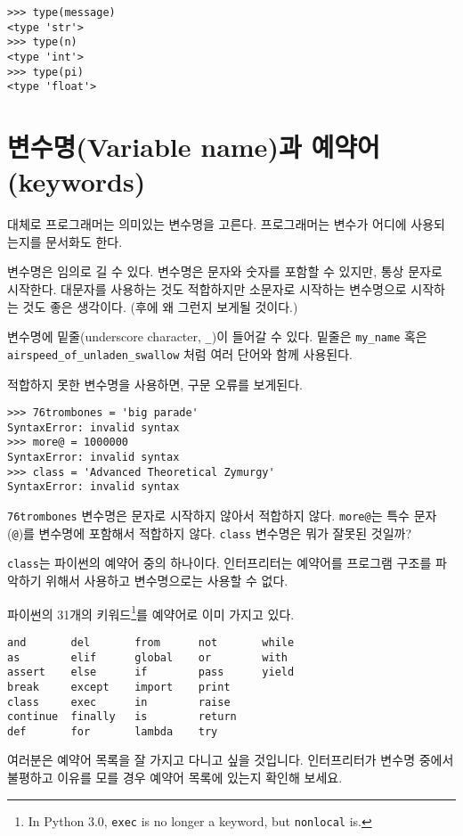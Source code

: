 \beforeverb
\begin{verbatim}
>>> type(message)
<type 'str'>
>>> type(n)
<type 'int'>
>>> type(pi)
<type 'float'>
\end{verbatim}
\afterverb
%

\section{변수명(Variable name)과 예약어(keywords)}
대체로 프로그래머는 의미있는 변수명을 고른다. 프로그래머는 변수가 어디에 사용되는지를 문서화도 한다.

변수명은 임의로 길 수 있다. 변수명은 문자와 숫자를 포함할 수 있지만, 통상 문자로 시작한다. 대문자를 사용하는 것도 적합하지만 소문자로 시작하는 변수명으로 시작하는 것도 좋은 생각이다. (후에 왜 그런지 보게될 것이다.)

변수명에 밑줄(underscore character, \verb"_")이 들어갈 수 있다. 밑줄은 \verb"my_name" 혹은 \verb"airspeed_of_unladen_swallow" 처럼 여러 단어와 함께 사용된다.


적합하지 못한 변수명을 사용하면, 구문 오류를 보게된다.

\beforeverb
\begin{verbatim}
>>> 76trombones = 'big parade'
SyntaxError: invalid syntax
>>> more@ = 1000000
SyntaxError: invalid syntax
>>> class = 'Advanced Theoretical Zymurgy'
SyntaxError: invalid syntax
\end{verbatim}
\afterverb
%

{\tt 76trombones} 변수명은 문자로 시작하지 않아서 적합하지 않다. {\tt more@}는 특수 문자 ({\tt @})를 변수명에 포함해서 적합하지 않다. {\tt class} 변수명은 뭐가 잘못된 것일까?

{\tt class}는 파이썬의 예약어 중의 하나이다. 인터프리터는 예약어를 프로그램 구조를 파악하기 위해서 사용하고 변수명으로는 사용할 수 없다.


파이썬의 31개의 키워드\footnote{In Python 3.0, {\tt exec} is no
longer a keyword, but {\tt nonlocal} is.}를 예약어로 이미 가지고 있다.

\beforeverb
\begin{verbatim}
and       del       from      not       while    
as        elif      global    or        with     
assert    else      if        pass      yield    
break     except    import    print              
class     exec      in        raise              
continue  finally   is        return             
def       for       lambda    try
\end{verbatim}
\afterverb
%
여러분은 예약어 목록을 잘 가지고 다니고 싶을 것입니다. 인터프리터가 변수명 중에서 불평하고 이유를 모를 경우 예약어 목록에 있는지 확인해 보세요.

